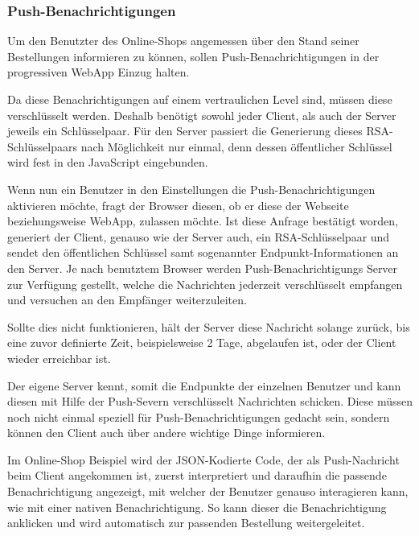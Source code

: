 \documentclass[a4paper,12pt,ngerman,listof=numbered]{scrartcl}      %
\begin{document}
	\subsubsection{Push-Benachrichtigungen}
	Um den Benutzter des Online-Shops angemessen über den Stand seiner Bestellungen informieren zu können, sollen Push-Benachrichtigungen in der progres\-siven WebApp Einzug halten.\par
	Da diese Benachrichtigungen auf einem vertraulichen Level sind, müssen diese verschlüsselt werden. Deshalb benötigt sowohl jeder Client, als auch der Server jeweils ein Schlüsselpaar. Für den Server passiert die Generierung dieses RSA-Schlüsselpaars nach Möglichkeit nur einmal, denn dessen öffentlicher Schlüssel wird fest in den JavaScript eingebunden.\par
	Wenn nun ein Benutzer in den Einstellungen die Push-Be\-nach\-rich\-ti\-gungen aktivieren möchte, fragt der Browser diesen, ob er diese der Webseite beziehungsweise Web\-App, zulassen möchte. Ist diese Anfrage bestätigt worden, generiert der Client, genauso wie der Server auch, ein RSA-Schlüsselpaar und sendet den öffentlichen Schlüssel samt sogenannter End\-punkt-In\-for\-ma\-ti\-onen an den Server. Je nach benutztem Browser werden Push-Benachrichtigungs Server zur Ver\-fü\-gung gestellt, welche die Nachrichten jederzeit verschlüsselt empfangen und versuchen an den Empfänger weiterzuleiten.\par
	Sollte dies nicht funktionieren, hält der Server diese Nachricht solange zurück, bis eine zuvor definierte Zeit, beispielsweise 2 Tage, abgelaufen ist, oder der Client wieder erreichbar ist.\par
	Der eigene Server kennt, somit die Endpunkte der einzelnen Benutzer und kann diesen mit Hilfe der Push-Severn verschlüsselt Nachrichten schicken. Diese müs\-sen noch nicht einmal speziell für Push-Be\-nach\-rich\-ti\-gungen gedacht sein, sondern können den Client auch über andere wichtige Dinge informieren.\par
	Im Online-Shop Beispiel wird der JSON-Kodierte Code, der als Push-Nachricht beim Client angekommen ist, zuerst interpretiert und daraufhin die passende Benachrichtigung angezeigt, mit welcher der Benutzer genauso interagieren kann, wie mit einer nativen Benachrichtigung. So kann dieser die Benachrichtigung an\-klicken und wird automatisch zur passenden Bestellung weitergeleitet.\par
	
	\newpage
\end{document}
